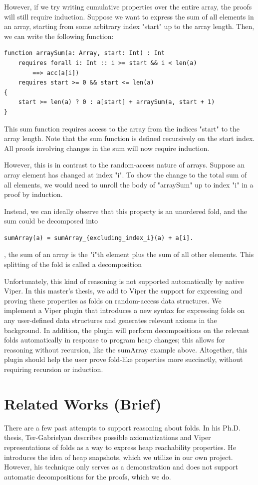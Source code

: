 \documentclass[msc,oneside]{ubcthesis}
\theoremstyle{definition}
\begin{document}
However, if we try writing cumulative properties over the entire array, the proofs will still require induction. Suppose we want to express the sum of all elements in an array, starting from some arbitrary index "start" up to the array length. Then, we can write the following function:
\begin{lstlisting}
function arraySum(a: Array, start: Int) : Int
    requires forall i: Int :: i >= start && i < len(a) 
        ==> acc(a[i])
    requires start >= 0 && start <= len(a)
{
    start >= len(a) ? 0 : a[start] + arraySum(a, start + 1)
}
\end{lstlisting}
This sum function requires access to the array from the indices "start" to the array length. Note that the sum function is defined recursively on the start index. All proofs involving changes in the sum will now require induction. 

However, this is in contrast to the random-access nature of arrays. Suppose an array element has changed at index "i". To show the change to the total sum of all elements, we would need to unroll the body of "arraySum" up to index "i" in a proof by induction. 

Instead, we can ideally observe that this property is an unordered fold, and the sum could be decomposed into 
\begin{lstlisting}
sumArray(a) = sumArray_{excluding_index_i}(a) + a[i].
\end{lstlisting}
\ie, the sum of an array is the "i"th element plus the sum of all other elements. This splitting of the fold is called a decomposition

Unfortunately, this kind of reasoning is not supported automatically by native Viper. In this master's thesis, we add to Viper the support for expressing and proving these properties as folds on random-access data structures. We implement a Viper plugin that introduces a new syntax for expressing folds on any user-defined data structures and generates relevant axioms in the background. In addition, the plugin will perform decompositions on the relevant folds automatically in response to program heap changes; this allows for reasoning without recursion, like the sumArray example above. Altogether, this plugin should help the user prove fold-like properties more succinctly, without requiring recursion or induction.

\section{Related Works (Brief)}
There are a few past attempts to support reasoning about folds. In his Ph.D. thesis, Ter-Gabrielyan describes possible axiomatizations and Viper representations of folds as a way to express heap reachability properties. He introduces the idea of heap snapshots, which we utilize in our own project. However, his technique only serves as a demonstration and does not support automatic decompositions for the proofs, which we do. 
\end{document}
